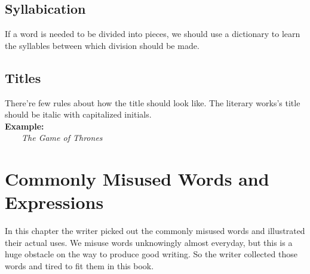 \documentclass[12pt]{report}
\newcommand{\xmpl}{\textbf{Example:}\\} %
\newcommand{\indnt}{\ \ \ \ } %
\begin{document}
\section{Syllabication}
If a word is needed to be divided into pieces, we should use a dictionary to learn the syllables between which division should be made.


\section{Titles}
There're few rules about how the title should look like. The literary works's title should be italic with capitalized initials.\\
\xmpl
\indnt \textit{The Game of Thrones}



\chapter{Commonly Misused Words and Expressions}
In this chapter the writer picked out the commonly misused words and illustrated their actual uses. We misuse words unknowingly almost everyday, but this is a huge obstacle on the way to produce good writing. So the writer collected those words and tired to fit them in this book.
\end{document}
